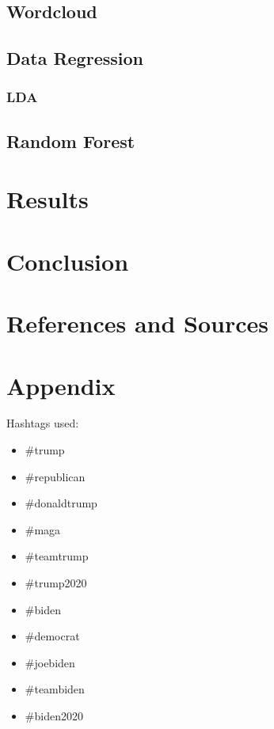 \documentclass[11pt, oneside]{article}
\begin{document}
\subsection{Wordcloud}



\subsection{Data Regression}

\subsubsection{LDA}



\subsection{Random Forest}



\section{Results}



\section{Conclusion}



\pagebreak
\section{References and Sources}


\pagebreak
\section{Appendix}
Hashtags used:
\begin{itemize}
	\item \#trump
    \item \#republican
    \item \#donaldtrump
    \item \#maga
    \item \#teamtrump
    \item \#trump2020 
    \item \#biden
    \item \#democrat
    \item \#joebiden
    \item \#teambiden
    \item \#biden2020
\end{itemize}
\end{document}
